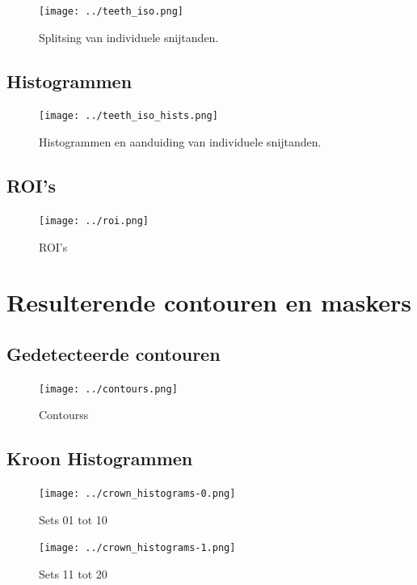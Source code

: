 \documentclass[10pt,a4paper]{article}
\begin{document}
\begin{figure}[H]
\centering
\texttt{[image: ../teeth\_iso.png]}
\caption{Splitsing van individuele snijtanden.}
\label{fig:teeth-isolation}
\end{figure}

\subsection*{Histogrammen}
\label{appendix:teeth-isolation-hists}

\begin{figure}[H]
\centering
\texttt{[image: ../teeth\_iso\_hists.png]}
\caption{Histogrammen en aanduiding van individuele snijtanden.}
\label{fig:teeth-isolation-hists}
\end{figure}

\subsection*{ROI's}
\label{appendix:rois}

\begin{figure}[H]
\centering
\texttt{[image: ../roi.png]}
\caption{ROI's}
\label{fig:rois}
\end{figure}

\section*{Resulterende contouren en maskers}
\label{appendix:contours}

\subsection*{Gedetecteerde contouren}

\begin{figure}[H]
\centering
\texttt{[image: ../contours.png]}
\caption{Contourss}
\label{fig:contours}
\end{figure}

\subsection*{Kroon Histogrammen}
\label{appendix:crown_histograms}

\begin{figure}[H]
\centering
\texttt{[image: ../crown\_histograms-0.png]}
\caption{Sets 01 tot 10}
\label{fig:crown_histograms-0}
\end{figure}

\begin{figure}[H]
\centering
\texttt{[image: ../crown\_histograms-1.png]}
\caption{Sets 11 tot 20}
\label{fig:crown_histograms-1}
\end{figure}
\end{document}
